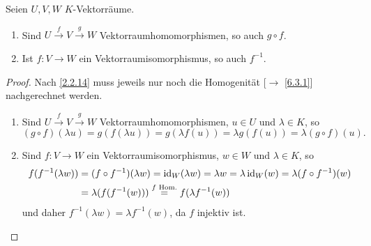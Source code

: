 \documentclass[../../main.tex]{subfiles}
\begin{document}
\begin{pro}\label{6.3.3}
Seien $U,V,W$ $K$-Vektorräume.
\begin{enumerate}[\rm(a)]
\item Sind $U\xrightarrow{f}V\xrightarrow{g}W$ Vektorraumhomomorphismen, so auch $g\circ f$.
\item Ist $f:V\to W$ ein Vektorraumisomorphismus, so auch $f^{-1}$.
\end{enumerate}
\end{pro}
\begin{proof}
Nach \ref{2.2.14} muss jeweils nur noch die Homogenität [$\to$ \ref{6.3.1}] nachgerechnet werden.
\begin{enumerate}[\normalfont(a)]
\item Sind $U\xrightarrow{f} V\xrightarrow{g} W$ Vektorraumhomomorphismen, $u\in U$ und $\lambda\in K$, so
$$(g\circ f)(\lambda u) = g(f(\lambda u)) = g(\lambda f(u)) = \lambda g(f(u)) = \lambda(g\circ f)(u).$$
\item Sind $f:V\to W$ ein Vektorraumisomorphismus, $w\in W$ und $\lambda\in K$, so
\begin{align*}
f(f^{-1}(\lambda w)) & = (f\circ f^{-1})(\lambda w) = \operatorname{id}_W(\lambda w) = \lambda w = \lambda \operatorname{id}_W(w) = \lambda(f\circ f^{-1})(w)\\
& = \lambda (f(f^{-1}(w))) \overset{f\text{ Hom.}}{=} f(\lambda f^{-1}(w))
\end{align*}
und daher $f^{-1}(\lambda w) = \lambda f^{-1}(w)$, da $f$ injektiv ist.
\end{enumerate}
\end{proof}
\end{document}
